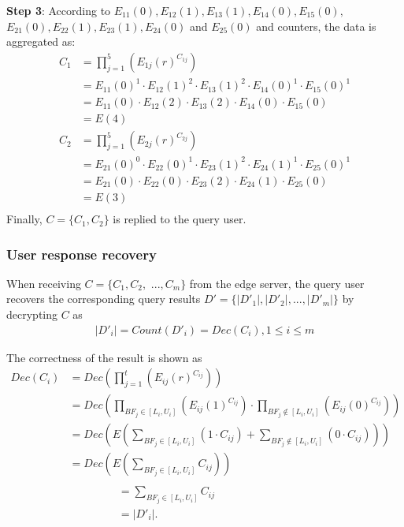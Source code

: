 \documentclass[IEEE JOURNAL OF BIOMEDICAL AND HEALTH INFORMATICS]{IEEEtran}
\begin{document}
  \textbf{Step 3}: According to $E_{11}(0),E_{12}(1), E_{13}(1),E_{14}(0), E_{15}(0),$ $ E_{21}(0),E_{22}(1), E_{23}(1), E_{24}(0)$ and $E_{25}(0)$ and counters, the data is aggregated as:
  \begin{align*}
  		C_1 &= \prod_{j=1}^{5}(E_{1j}(r)^{C_{1j}})\\
  		    &= E_{11}(0)^{1} \cdot E_{12}(1)^{2} \cdot E_{13}(1)^{2} \cdot E_{14}(0)^{1} \cdot E_{15}(0)^{1} \\
  		    &= E_{11}(0) \cdot E_{12}(2) \cdot E_{13}(2) \cdot E_{14}(0) \cdot E_{15}(0) \\ 
  		    &= E(4)\\
  		C_2 &= \prod_{j=1}^{5}(E_{2j}(r)^{C_{2j}})\\
  		    &= E_{21}(0)^{0} \cdot E_{22}(0)^{1} \cdot E_{23}(1)^{2} \cdot E_{24}(1)^{1} \cdot E_{25}(0)^{1} \\
  		    &= E_{21}(0) \cdot E_{22}(0) \cdot E_{23}(2) \cdot E_{24}(1) \cdot E_{25}(0) \\ 
  		    &= E(3)\\	
  \end{align*}
  Finally, $C=\{C_1, C_2\}$ is replied to the query user.\\
  
	


\subsubsection{User response recovery}
When receiving $C=\{C_1, C_2,$ $ ..., C_m\}$ from the edge server, the query user recovers the corresponding query results $D'=\{|D'_1|, |D'_2|, ... ,|D'_m|\}$ by decrypting $C$ as
\begin{align*}
|D'_i|= Count(D'_i) = Dec(C_i), 1\le i \le m
\end{align*}

The correctness of the result is shown as
\begin{align*}
	Dec(C_i) &= Dec(\prod_{j=1}^{t}(E_{ij}(r)^{C_{ij}})) \\
&= Dec(\prod_{BF_j\in [L_i, U_i]}(E_{ij}(1)^{C_{ij}}) \cdot \prod_{BF_j \notin [L_i, U_i]}(E_{ij}(0)^{C_{ij}})) \\ 
&= Dec(E(\sum_{BF_j \in [L_i, U_i]}(1\cdot C_{ij}) + \sum_{BF_j \notin [L_i, U_i]}(0\cdot C_{ij}))) \\
&= Dec(E(\sum_{BF_j \in [L_i, U_i]}C_{ij})) \\
\end{align*}\begin{align*}
&= \sum_{BF_j \in [L_i, U_i]}C_{ij}\ \ \ \ \ \ \ \ \ \ \ \ \ \ \ \ \ \ \ \ \ \ \ \ \ \ \ \ \ \ \ \ \ \ \ \ \\\
&= |D'_i|.
\end{align*}
\end{document}
